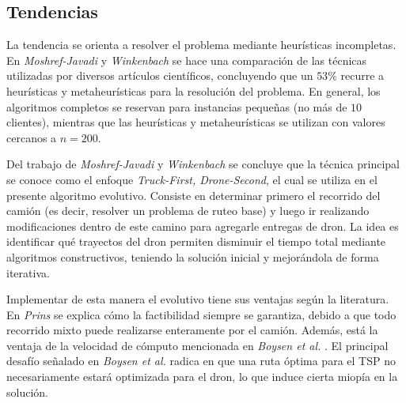 \subsection{Tendencias}

La tendencia se orienta a resolver el problema mediante heurísticas incompletas. En \textit{Moshref-Javadi} y \textit{Winkenbach} \cite{moshrefjavadi2021applications} se hace una comparación de las técnicas utilizadas por diversos artículos científicos, concluyendo que un $53\%$ recurre a heurísticas y metaheurísticas para la resolución del problema. En general, los algoritmos completos se reservan para instancias pequeñas (no más de $10$ clientes), mientras que las heurísticas y metaheurísticas se utilizan con valores cercanos a $n=200$.


Del trabajo de \textit{Moshref-Javadi} y \textit{Winkenbach} \cite{moshrefjavadi2021applications} se concluye que la técnica principal se conoce como el enfoque \textit{Truck-First, Drone-Second}, el cual se utiliza en el presente algoritmo evolutivo. Consiste en determinar primero el recorrido del camión (es decir, resolver un problema de ruteo base) y luego ir realizando modificaciones dentro de este camino para agregarle entregas de dron. La idea es identificar qué trayectos del dron permiten disminuir el tiempo total mediante algoritmos constructivos, teniendo la solución inicial y mejorándola de forma iterativa.

Implementar de esta manera el evolutivo tiene sus ventajas según la literatura. En \textit{Prins} \cite{prins2004simple} se explica cómo la factibilidad siempre se garantiza, debido a que todo recorrido mixto puede realizarse enteramente por el camión. Además, está la ventaja de la velocidad de cómputo mencionada en \textit{Boysen et al.} \cite{boysen2018drone}. El principal desafío señalado en \textit{Boysen et al.} \cite{boysen2018drone} radica en que una ruta óptima para el TSP no necesariamente estará optimizada para el dron, lo que induce cierta miopía en la solución.
